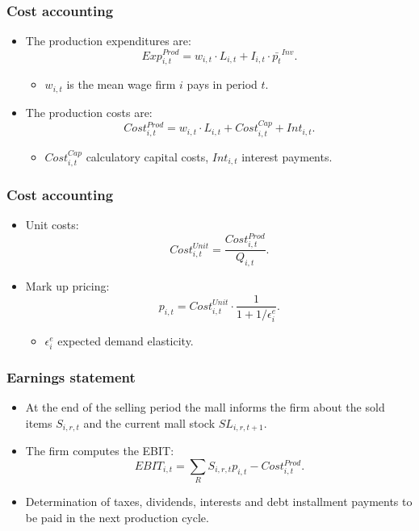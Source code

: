 \documentclass{beamer}
\begin{document}
\frame
{

  \frametitle{Cost accounting} 
\begin{itemize}

\item The production expenditures are: 
\[
Exp^{Prod}_{i,t}=  w_{i,t} \cdot L_{i,t} + I_{i,t}\cdot \bar{p_{t}}^{Inv}.
\]
\begin{itemize}
	\item $w_{i,t}$ is the mean wage firm $i$ pays in period $t$. 
\end{itemize}
\item The production costs are: 
\[Cost^{Prod}_{i,t}= w_{i,t} \cdot L_{i,t} + Cost^{Cap}_{i,t}+ Int_{i,t}.
\] 
\begin{itemize}
	\item $Cost^{Cap}_{i,t}$ calculatory capital costs, $Int_{i,t}$ interest payments.
\end{itemize}
\end{itemize}
}
\frame
{

  \frametitle{Cost accounting} 
\begin{itemize}

\item Unit costs: 
\[
Cost^{Unit}_{i,t}=\frac{Cost^{Prod}_{i,t}}{Q_{i,t}}.
\]
\item Mark up pricing:  \[
p_{i,t}= Cost^{Unit}_{i,t}\cdot \frac{1}{1+1/\epsilon^e_i}.
\]
\begin{itemize}
	\item $\epsilon^e_i$ expected demand elasticity.
\end{itemize}
 
\end{itemize}
  
}



\frame
{

  \frametitle{Earnings statement} 
\begin{itemize}

\item At the end of the selling period the mall informs the firm about the sold items $S_{i,r,t}$ and the current mall stock $SL_{i,r,t+1}.$

\item The firm computes the EBIT: 
\[
EBIT_{i,t}= \sum_{R}S_{i,r,t}p_{i,t} - Cost^{Prod}_{i,t}.
\]
\item Determination of taxes, dividends, interests and debt installment payments to be paid in the next production cycle.
\end{itemize}
  
}
\end{document}
